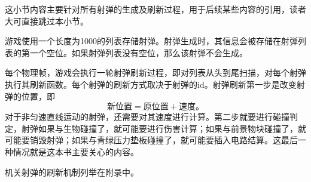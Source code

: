 这小节内容主要针对所有射弹的生成及刷新过程，用于后续某些内容的引用，读者大可直接跳过本小节。

游戏使用一个长度为1000的列表存储射弹。射弹生成时，其信息会被存储在射弹列表的第一个空位。如果射弹列表没有空位，那么该射弹不会生成。

每个物理帧，游戏会执行一轮射弹刷新过程，即对列表从头到尾扫描，对每个射弹执行其刷新函数。每个射弹的刷新方式取决于射弹的id。射弹刷新第一步是改变射弹的位置，即$$\textrm{新位置}=\textrm{原位置}+\textrm{速度。}$$对于非匀速直线运动的射弹，还需要对其速度进行计算。第二步就要进行碰撞判定，射弹如果与生物碰撞了，就可能要进行伤害计算；如果与前景物块碰撞了，就可能要销毁射弹；如果与青绿压力垫板碰撞了，就可能要插入电路结算。这最后一种情况就是这本书主要关心的内容。

机关射弹的刷新机制列举在附录中。